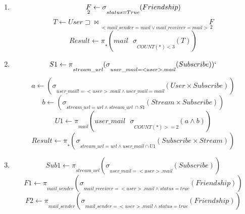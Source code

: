 \documentclass[a4paper,10pt]{article}
\begin{document}
	\begin{enumerate}
	    \item
		\begin{equation}
		\underset{2}{F} \leftarrow \sigma \underset{status = True}{} (Friendship) \\
		\end{equation}
		\begin{equation}
		T \leftarrow User \sqsupset \Join \underset{<mail\_sender = mail \vee mail\_receiver = mail>}{} \underset{2}{F} 
		\end{equation}
		\begin{equation}
		Result \leftarrow \pi \underset{*}{}(mail \  \  \  \sigma \underset{COUNT(*) < 3}{}(T))
		\end{equation}
	    \item
		\begin{equation}
		S1 \leftarrow \pi \underset{stream\_url}{} (\sigma \underset{user\_mail = <user>.mail}{}(Subscribe))`
		\end{equation}
		\begin{equation}
		a \leftarrow (\sigma \underset{user\_mail != <user>.mail \wedge user\_mail = mail}{}(User \times Subscribe))
		\end{equation}
		\begin{equation}
		b \leftarrow (\sigma \underset{stream\_url = url \wedge stream\_url\  \cap S1}{}(Stream \times Subscribe))
		\end{equation}
		\begin{equation}
		U1 \leftarrow \pi \underset{mail}{} (user\_mail \  \  \  \sigma \underset{COUNT(*) >= 2}{}(a \wedge b))
		\end{equation}
		\begin{equation}
		Result \leftarrow \pi \underset{*}{} (\sigma \underset {stream\_url = url \wedge user\_mail \cap U1}{}(Subscribe \times Stream))
		\end{equation}
	    \item 
	          \begin{equation}
		Sub1 \leftarrow \pi \underset{stream\_url}{} (\sigma \underset{user\_mail = <user>.mail}{}(Subscribe))
		\end{equation}
		\begin{equation}
		F1 \leftarrow \pi \underset{mail\_sender}{} (\sigma \underset{mail\_receiver = <user>.mail \wedge status = true}{}(Friendship))
		\end{equation}
		\begin{equation}
		F2 \leftarrow \pi \underset{mail\_sender}{} (\sigma \underset{mail\_sender = <user>.mail \wedge status = true}{}(Friendship))

\end{equation}
\end{enumerate}
\end{document}

